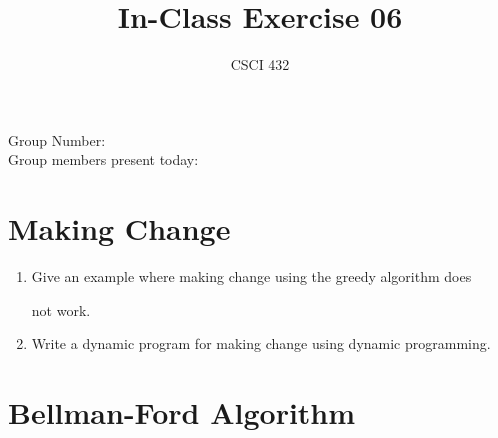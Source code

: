 \documentclass{article}
\title{In-Class Exercise 06}
\author{CSCI 432}
\begin{document}
\maketitle



\noindent

Group Number:\\

Group members present today:



\section*{Making Change}



\begin{enumerate}

    \item Give an example where making change using the greedy algorithm does

        not work.

        \vspace{1in}

    \item Write a dynamic program for making change using dynamic programming.

\end{enumerate}



\newpage

\section*{Bellman-Ford Algorithm}
\end{document}
